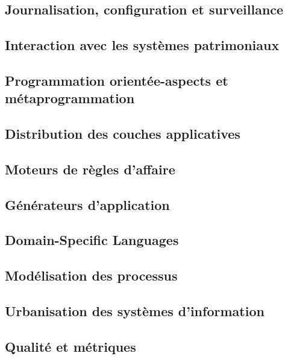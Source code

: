 \documentclass{article}
\begin{document}
\subsection{Journalisation, configuration et surveillance}
\subsection{Interaction avec les systèmes patrimoniaux}
\subsection{Programmation orientée-aspects et métaprogrammation}
\subsection{Distribution des couches applicatives}
\subsection{Moteurs de règles d'affaire}
\subsection{Générateurs d'application}
\subsection{Domain-Specific Languages}
\subsection{Modélisation des processus}
\subsection{Urbanisation des systèmes d'information}
\subsection{Qualité et métriques}

\pagebreak


\end{document}
